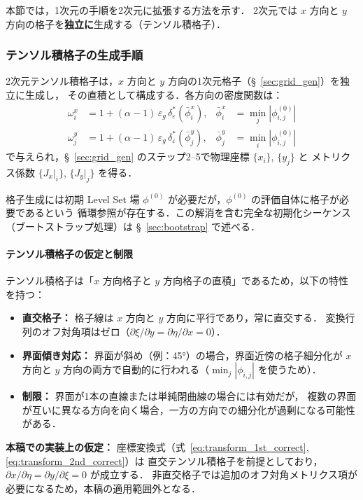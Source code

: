 本節では，1次元の手順を2次元に拡張する方法を示す．
2次元では $x$ 方向と $y$ 方向の格子を\textbf{独立に}生成する（テンソル積格子）．

\subsubsection{テンソル積格子の生成手順}

2次元テンソル積格子は，$x$ 方向と $y$ 方向の1次元格子（§~\ref{sec:grid_gen}）を独立に生成し，
その直積として構成する．各方向の密度関数は：
\begin{align*}
  \omega^x_i &= 1 + (\alpha-1)\,\varepsilon_g\,\delta_\varepsilon^*(\bar{\phi}^x_i), &
  \bar{\phi}^x_i &= \min_j |\phi^{(0)}_{i,j}| \\
  \omega^y_j &= 1 + (\alpha-1)\,\varepsilon_g\,\delta_\varepsilon^*(\bar{\phi}^y_j), &
  \bar{\phi}^y_j &= \min_i |\phi^{(0)}_{i,j}|
\end{align*}
で与えられ，§~\ref{sec:grid_gen} のステップ2--5で物理座標 $\{x_i\}$, $\{y_j\}$ と
メトリクス係数 $\{J_x|_i\}$, $\{J_y|_j\}$ を得る．

格子生成には初期 Level Set 場 $\phi^{(0)}$ が必要だが，$\phi^{(0)}$ の評価自体に格子が必要であるという
循環参照が存在する．この解消を含む完全な初期化シーケンス（ブートストラップ処理）は
§~\ref{sec:bootstrap} で述べる．

\paragraph{テンソル積格子の仮定と制限}
テンソル積格子は「$x$ 方向格子と $y$ 方向格子の直積」であるため，以下の特性を持つ：
\begin{itemize}
  \item \textbf{直交格子：} 格子線は $x$ 方向と $y$ 方向に平行であり，常に直交する．
        変換行列のオフ対角項はゼロ（$\partial\xi/\partial y = \partial\eta/\partial x = 0$）．
  \item \textbf{界面傾き対応：} 界面が斜め（例：45°）の場合，界面近傍の格子細分化が
        $x$ 方向と $y$ 方向の両方で自動的に行われる（$\min_j|\phi_{i,j}|$ を使うため）．
  \item \textbf{制限：} 界面が1本の直線または単純閉曲線の場合には有効だが，
        複数の界面が互いに異なる方向を向く場合，一方の方向での細分化が過剰になる可能性がある．
\end{itemize}

\textbf{本稿での実装上の仮定：} 座標変換式（式~\eqref{eq:transform_1st_correct}, \eqref{eq:transform_2nd_correct}）は
直交テンソル積格子を前提としており，$\partial x/\partial\eta = \partial y/\partial\xi = 0$ が成立する．
非直交格子では追加のオフ対角メトリクス項が必要になるため，本稿の適用範囲外となる．

